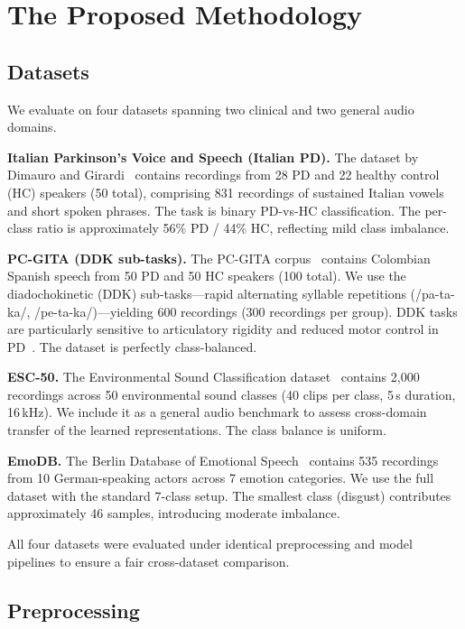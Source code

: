 \documentclass[conference]{IEEEtran}
\begin{document}
\section{The Proposed Methodology}

\subsection{Datasets}

We evaluate on four datasets spanning two clinical and two general audio domains.

\textbf{Italian Parkinson's Voice and Speech (Italian PD).} The dataset by Dimauro and Girardi~\cite{dimauro2019} contains recordings from 28 PD and 22 healthy control (HC) speakers (50 total), comprising 831 recordings of sustained Italian vowels and short spoken phrases. The task is binary PD-vs-HC classification. The per-class ratio is approximately 56\% PD / 44\% HC, reflecting mild class imbalance.

\textbf{PC-GITA (DDK sub-tasks).} The PC-GITA corpus~\cite{orozco2014} contains Colombian Spanish speech from 50 PD and 50 HC speakers (100 total). We use the diadochokinetic (DDK) sub-tasks---rapid alternating syllable repetitions (/pa-ta-ka/, /pe-ta-ka/)---yielding 600 recordings (300 recordings per group). DDK tasks are particularly sensitive to articulatory rigidity and reduced motor control in PD~\cite{orozco2016}. The dataset is perfectly class-balanced.

\textbf{ESC-50.} The Environmental Sound Classification dataset~\cite{piczak2015} contains 2{,}000 recordings across 50 environmental sound classes (40 clips per class, 5\,s duration, 16\,kHz). We include it as a general audio benchmark to assess cross-domain transfer of the learned representations. The class balance is uniform.

\textbf{EmoDB.} The Berlin Database of Emotional Speech~\cite{burkhardt2005} contains 535 recordings from 10 German-speaking actors across 7 emotion categories. We use the full dataset with the standard 7-class setup. The smallest class (disgust) contributes approximately 46 samples, introducing moderate imbalance.

All four datasets were evaluated under identical preprocessing and model pipelines to ensure a fair cross-dataset comparison.

\subsection{Preprocessing}
\end{document}
